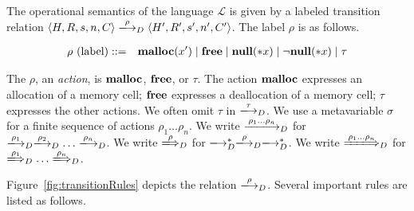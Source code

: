 The operational semantics of the language \(\mathcal{L}\) is given by
a labeled transition relation \(\langle H, R, s, n, C \rangle
\xlongrightarrow{\rho}_D \langle H', R', s', n', C' \rangle\). The label
\(\rho\) is as follows.

\begin{eqnarray*}
 \rho \mbox{ (label)} &::=& \Malloc(x') \mid \Free \mid \snull \mid \snnull \mid \tau %
\end{eqnarray*}

The \(\rho\), an \emph{action}, is \(\mathbf{malloc}\), \(\mathbf{free}\), or
\(\tau\).  The action \(\mathbf{malloc}\) expresses an allocation of a memory
cell; \(\mathbf{free}\) expresses a deallocation of a memory cell; \(\tau\)
expresses the other actions.  We often omit \(\tau\) in
\(\xlongrightarrow{\tau}_D\).  We use a metavariable \(\sigma\) for a
finite sequence of actions \(\rho_1\dots\rho_n\).  We write
\(\xlongrightarrow{\rho_1\dots\rho_n}_D\) for
\(\xlongrightarrow{\rho_1}_D\xlongrightarrow{\rho_2}_D\dots\xlongrightarrow{\rho_n}_D\).
We write \(\xLongrightarrow{\rho}_D\) for
\(\xlongrightarrow{}_D^*\xlongrightarrow{\rho}_D\xlongrightarrow{}_D^*\).
We write \(\xLongrightarrow{\rho_1\dots\rho_n}_D\) for
\(\xLongrightarrow{\rho_1}_D\dots\xLongrightarrow{\rho_n}_D\).

Figure~\ref{fig:transitionRules} depicts the relation
\(\xlongrightarrow{\rho}_D\). Several important rules are listed as
follows.

